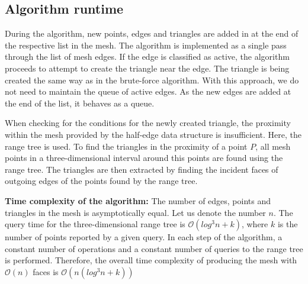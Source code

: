 \subsection{Algorithm runtime}
During the algorithm, new points, edges and triangles are added in
at the end of the respective list in the mesh. 
The algorithm is implemented as a single pass through the list of 
mesh edges. 
If the edge is classified as active, the algorithm proceeds 
to attempt to create the triangle near the edge. 
The triangle is being created the same way as in the brute-force
algorithm.
With this approach, we do not need to
maintain the queue of active edges. As the new edges are added at 
the end of the list, it behaves as a queue.

When checking for the conditions for the newly created triangle, the 
proximity within the mesh provided by the half-edge data structure is
insufficient. Here, the range tree is used. To find the triangles in the
proximity of a point $P$, all mesh points in a three-dimensional interval
around this points are found using the range tree. The triangles are then 
extracted by finding the incident faces of outgoing edges of the points
found by the range tree.

\textbf{Time complexity of the algorithm:}
The number of edges, points and triangles in the mesh is asymptotically 
equal. Let us denote the number $n$. The query time for the three-dimensional 
range tree is $\mathcal{O}(log^3n+k)$, where $k$ is the number of points
reported by a given query. In each step of the algorithm, a constant number of
operations and a constant number of queries to the range tree is performed.
Therefore, the overall time complexity of producing the mesh with $\mathcal{O}(n)$
faces is $\mathcal{O}(n (log^3n+k))$